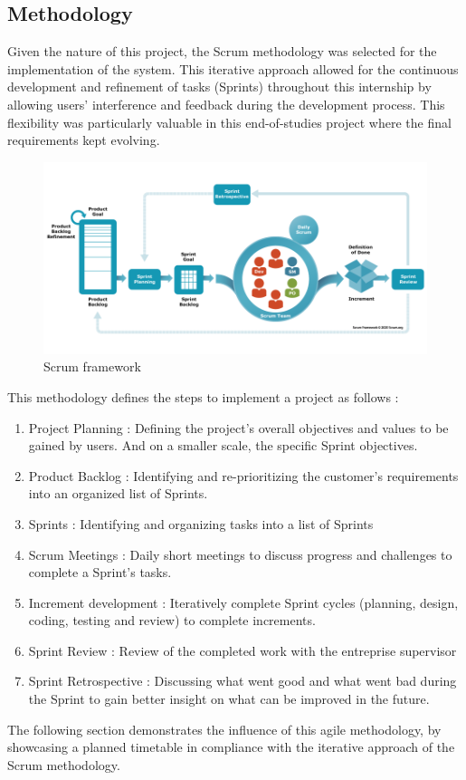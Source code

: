 \subsection{Methodology}
Given the nature of this project, the Scrum methodology was selected for the implementation of the system. This iterative approach allowed for the continuous development and refinement of tasks (Sprints) throughout this internship by allowing users' interference and feedback during the development process. This flexibility was particularly valuable in this end-of-studies project where the final requirements kept evolving.
\begin{figure}[H]
    \centering
    \includegraphics[width=\linewidth]{./figures/scrum-framework-9.29.23.png}
    \caption{Scrum framework \cite{scrum}}
\end{figure}
This methodology defines the steps to implement a project as follows :
\begin{enumerate}
    \item Project Planning : Defining the project's overall objectives and values to be gained by users. And on a smaller scale, the specific Sprint objectives.
    \item Product Backlog : Identifying and re-prioritizing the customer's requirements into an organized list of Sprints.
    \item Sprints : Identifying and organizing tasks into a list of Sprints
    \item Scrum Meetings : Daily short meetings to discuss progress and challenges to complete a Sprint's tasks.
    \item Increment development : Iteratively complete Sprint cycles (planning, design, coding, testing and review) to complete increments.
    \item Sprint Review : Review of the completed work with the entreprise supervisor
    \item Sprint Retrospective : Discussing what went good and what went bad during the Sprint to gain better insight on what can be improved in the future.
\end{enumerate}
The following section demonstrates the influence of this agile methodology, by showcasing a planned timetable in compliance with the iterative approach of the Scrum methodology.
